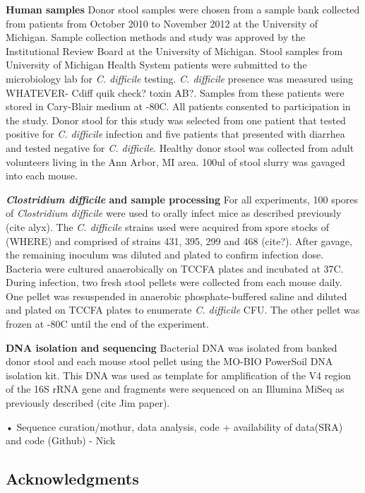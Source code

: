 \documentclass[11pt,]{article}
\begin{document}
\textbf{Human samples} Donor stool samples were chosen from a sample
bank collected from patients from October 2010 to November 2012 at the
University of Michigan. Sample collection methods and study was approved
by the Institutional Review Board at the University of Michigan. Stool
samples from University of Michigan Health System patients were
submitted to the microbiology lab for \emph{C. difficile} testing.
\emph{C. difficile} presence was measured using WHATEVER- Cdiff quik
check? toxin AB?. Samples from these patients were stored in Cary-Blair
medium at -80C. All patients consented to participation in the study.
Donor stool for this study was selected from one patient that tested
positive for \emph{C. difficile} infection and five patients that
presented with diarrhea and tested negative for \emph{C. difficile}.
Healthy donor stool was collected from adult volunteers living in the
Ann Arbor, MI area. 100ul of stool slurry was gavaged into each mouse.

\textbf{\emph{Clostridium difficile} and sample processing} For all
experiments, 100 spores of \emph{Clostridium difficile} were used to
orally infect mice as described previously (cite alyx). The \emph{C.
difficile} strains used were acquired from spore stocks of (WHERE) and
comprised of strains 431, 395, 299 and 468 (cite?). After gavage, the
remaining inoculum was diluted and plated to confirm infection dose.
Bacteria were cultured anaerobically on TCCFA plates and incubated at
37C. During infection, two fresh stool pellets were collected from each
mouse daily. One pellet was resuspended in anaerobic phosphate-buffered
saline and diluted and plated on TCCFA plates to enumerate \emph{C.
difficile} CFU. The other pellet was frozen at -80C until the end of the
experiment.

\textbf{DNA isolation and sequencing} Bacterial DNA was isolated from
banked donor stool and each mouse stool pellet using the MO-BIO
PowerSoil DNA isolation kit. This DNA was used as template for
amplification of the V4 region of the 16S rRNA gene and fragments were
sequenced on an Illumina MiSeq as previously described (cite Jim paper).

• Sequence curation/mothur, data analysis, code + availability of
data(SRA) and code (Github) - Nick

\subsection{Acknowledgments}\label{acknowledgments}
\end{document}
